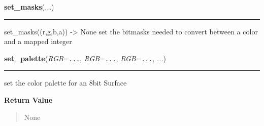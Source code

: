     \vspace{0.5ex}

\hspace{.8\funcindent}\begin{boxedminipage}{\funcwidth}

    \raggedright \textbf{set\_masks}(\textit{...})

    \vspace{-1.5ex}

    \rule{\textwidth}{0.5\fboxrule}
\setlength{\parskip}{2ex}
    set\_masks((r,g,b,a)) -{\textgreater} None set the bitmasks needed to 
    convert between a color and a mapped integer

\setlength{\parskip}{1ex}
    \end{boxedminipage}

    \label{pygame:Surface:set_palette}

    \vspace{0.5ex}

\hspace{.8\funcindent}\begin{boxedminipage}{\funcwidth}

    \raggedright \textbf{set\_palette}(\textit{RGB}={\tt ...}, \textit{RGB}={\tt ...}, \textit{RGB}={\tt ...}, \textit{...})

    \vspace{-1.5ex}

    \rule{\textwidth}{0.5\fboxrule}
\setlength{\parskip}{2ex}
    set the color palette for an 8bit Surface

\setlength{\parskip}{1ex}
      \textbf{Return Value}
    \vspace{-1ex}

      \begin{quote}
      None

      \end{quote}

    \end{boxedminipage}

    \label{pygame:Surface:set_palette_at}

    \vspace{0.5ex}

